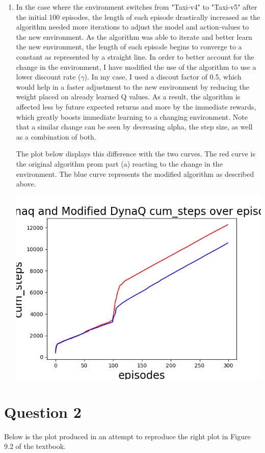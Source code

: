 \documentclass[11pt]{article}
\begin{document}
\begin{enumerate}[label=(\alph*)]
\item
In the case where the environment switches from "Taxi-v4" to "Taxi-v5" after the initial 100 episodes, the length of each episode drastically increased as the algorithm needed more iterations to adjust the model and action-values to the new environment. As the algorithm was able to iterate and better learn the new environment, the length of each episode begins to converge to a constant as represented by a straight line. In order to better account for the change in the environment, I have modified the use of the algorithm to use a lower discount rate ($\gamma$). In my case, I used a discout factor of 0.5, which would help in a faster adjustment to the new environment by reducing the weight placed on already learned Q values. As a result, the algorithm is affected less by future expected returns and more by the immediate rewards, which greatly boosts immediate learning to a changing environment. Note that a similar change can be seen by decreasing alpha, the step size, as well as a combination of both.

The plot below displays this difference with the two curves. The red curve is the original algorithm prom part (a) reacting to the change in the environment. The blue curve represents the modified algorithm as described above.

\includegraphics[scale=1.0]{Figure2.png}
\end{enumerate}

\section*{Question 2}
Below is the plot produced in an attempt to reproduce the right plot in Figure 9.2 of the textbook.
\end{document}
